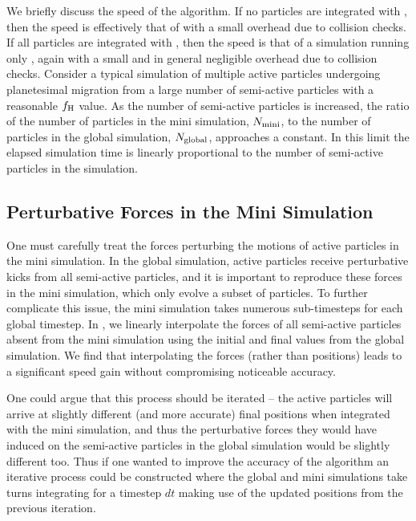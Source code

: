 We briefly discuss the speed of the algorithm.
If no particles are integrated with \ias, then the speed is effectively that of \whfast with a small overhead due to collision checks.
If all particles are integrated with \ias, then the speed is that of a simulation running only \ias, again with a small and in general negligible overhead due to collision checks. 
Consider a typical simulation of multiple active particles undergoing planetesimal migration from a large number of semi-active particles with a reasonable $f_{\rm H}$ value.
As the number of semi-active particles is increased, the ratio of the number of particles in the mini simulation, $N_{\rm mini}$, to the number of particles in the global simulation, $N_{\rm global}$, approaches a constant. 
In this limit the elapsed simulation time is linearly proportional to the number of semi-active particles in the simulation.

\subsection{Perturbative Forces in the Mini Simulation}
\label{sec:add}
One must carefully treat the forces perturbing the motions of active particles in the mini simulation. 
In the global simulation, active particles receive perturbative kicks from all semi-active particles, and it is important to reproduce these forces in the mini simulation, which only evolve a subset of particles. 
To further complicate this issue, the mini simulation takes numerous sub-timesteps for each global timestep.
In \hermes, we linearly interpolate the forces of all semi-active particles absent from the mini simulation using the initial and final values from the global simulation.
We find that interpolating the forces (rather than positions) leads to a significant speed gain without compromising noticeable accuracy.

One could argue that this process should be iterated -- the active particles will arrive at slightly different (and more accurate) final positions when integrated with the mini simulation, and thus the perturbative forces they would have induced on the semi-active particles in the global simulation would be slightly different too.
Thus if one wanted to improve the accuracy of the algorithm an iterative process could be constructed where the global and mini simulations take turns integrating for a timestep $dt$ making use of the updated positions from the previous iteration. 

